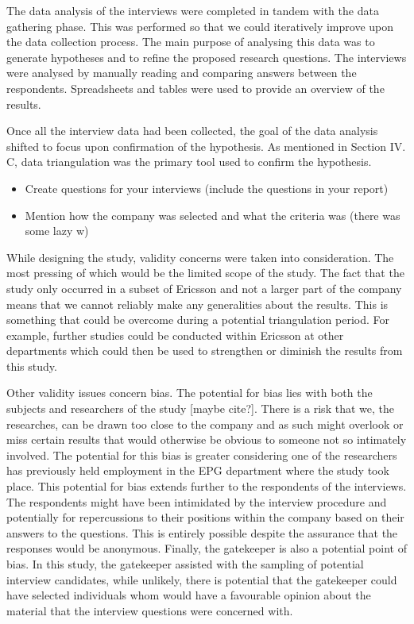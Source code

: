 \documentclass[10pt,twocolumn]{article}
\begin{document}
The data analysis of the interviews were completed in tandem with the data gathering phase. This was performed so that we could iteratively improve upon the data collection process. The main purpose of analysing this data was to generate hypotheses and to refine the proposed research questions. The interviews were analysed by manually reading and comparing answers between the respondents. Spreadsheets and tables were used to provide an overview of the results.

Once all the interview data had been collected, the goal of the data analysis shifted to focus upon confirmation of the hypothesis. As mentioned in Section IV. C, data triangulation was the primary tool used to confirm the hypothesis. 


\begin{itemize}
\item Create questions for your interviews (include the questions in your report)
\item Mention how the company was selected and what the criteria was (there was some lazy w)
\end{itemize}


While designing the study, validity concerns were taken into consideration. The most pressing of which would be the limited scope of the study. The fact that the study only occurred in a subset of Ericsson and not a larger part of the company means that we cannot reliably make any generalities about the results. This is something that could be overcome during a potential triangulation period. For example, further studies could be conducted within Ericsson at other departments which could then be used to strengthen or diminish the results from this study.

Other validity issues concern bias. The potential for bias lies with both the subjects and researchers of the study [maybe cite?]. There is a risk that we, the researches, can be drawn too close to the company and as such might overlook or miss certain results that would otherwise be obvious to someone not so intimately involved. The potential for this bias is greater considering one of the researchers has previously held employment in the EPG department where the study took place. This potential for bias extends further to the respondents of the interviews. The respondents might have been intimidated by the interview procedure and potentially for repercussions to their positions within the company based on their answers to the questions. This is entirely possible despite the assurance that the responses would be anonymous. Finally, the gatekeeper is also a potential point of bias. In this study, the gatekeeper assisted with the sampling of potential interview candidates, while unlikely, there is potential that the gatekeeper could have selected individuals whom would have a favourable opinion about the material that the interview questions were concerned with.
\end{document}
